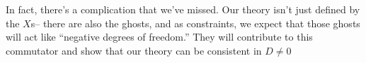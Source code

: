 In fact, there's a complication that we've missed. Our theory isn't just defined by the $X$s-- there are also the ghosts, and as constraints, we expect that those ghosts will act like ``negative degrees of freedom.'' They will contribute to this commutator and show that our theory can be consistent in $D\neq 0$